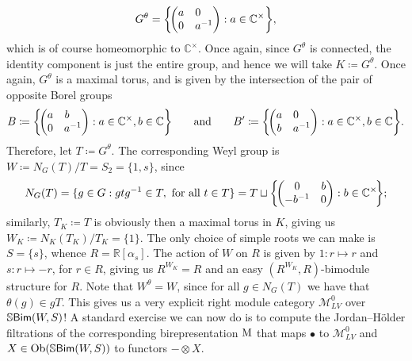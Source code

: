 \begin{example}
\begin{align*}
\begin{split}
G^\theta = \left\{\!\begin{pmatrix}a&0\hphantom{{}^{-1}}\\0&a^{-1}\end{pmatrix} : a \in \mathbb{C}^\times\right\}\!,
\end{split}
\end{align*}
\noindent which is of course homeomorphic to $\mathbb{C}^\times$. Once again, since $G^\theta$ is connected, the identity component is just the entire group, and hence we will take $K \coloneqq G^\theta$. Once again, $G^\theta$ is a maximal torus, and is given by the intersection of the pair of opposite Borel groups
\begin{align*}
\begin{split}
B \coloneqq \left\{\!\begin{pmatrix}a&b\hphantom{{}^{-1}}\\0&a^{-1}\end{pmatrix} : a \in \mathbb{C}^\times, b \in \mathbb{C}\right\}\!\qquad\text{and}\qquad B' \coloneqq \left\{\!\begin{pmatrix}a&0\hphantom{{}^{-1}}\\b&a^{-1}\end{pmatrix} : a \in \mathbb{C}^\times, b \in \mathbb{C}\right\}\!.
\end{split}
\end{align*}
\noindent Therefore, let $T \coloneqq G^\theta$. The corresponding Weyl group is $W \coloneqq N_G(T)/T = S_2 = \{1, s\}$, since
\begin{align*}
\begin{split}
N_G(T) = \{g \in G : gtg^{-1} \in T,\ \textnormal{for all $t \in T$}\} = T \sqcup \left\{\!\begin{pmatrix}0&b\\-b^{-1}&0\end{pmatrix} : b \in \mathbb{C}^\times\!\right\}\!;
\end{split}
\end{align*}
\noindent similarly, $T_K \coloneqq T$ is obviously then a maximal torus in $K$, giving us $W_K \coloneqq N_K(T_K)/T_K = \{1\}$. The only choice of simple roots we can make is $S = \{s\}$, whence $R = \mathbb{R}[\alpha_{s}]$. The action of $W$ on $R$ is given by $1 : r \mapsto r$ and $s : r \mapsto -r$, for $r \in R$, giving us $R^{W_K} = R$ and an easy $(R^{W_K}, R)$-bimodule structure for $R$. Note that $W^\theta = W$, since for all $g \in N_G(T)$ we have that $\theta(g) \in gT$. This gives us a very explicit right module category $\mathcal{M}_{LV}^0$ over $\mathbb{S}\textnormal{\textsf{Bim}}(W, S)$! A standard exercise we can now do is to compute the Jordan--H\"{o}lder filtrations of the corresponding birepresentation $\textnormal{M}$ that maps $\bullet$ to $\mathcal{M}_{LV}^0$ and $X \in \textnormal{Ob}(\mathbb{S}\textnormal{\textsf{Bim}}(W, S))$ to functors $- \otimes X$.\\[-1.5\baselineskip]%

\end{example}
